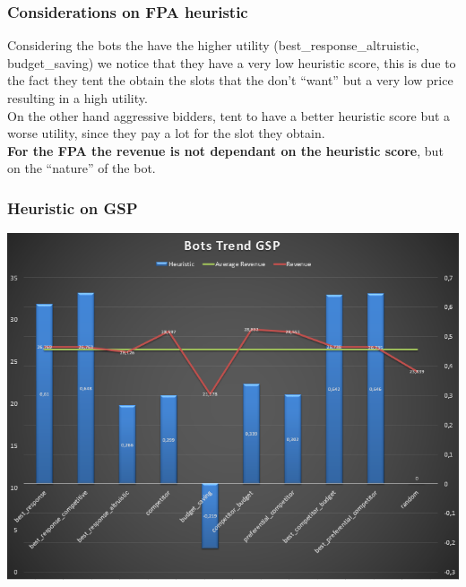 \documentclass{beamer}
\begin{document}
\begin{frame}
\frametitle{Considerations on FPA heuristic}
Considering the bots the have the higher utility (best\_response\_altruistic, budget\_saving) we notice that they have a very \alert{low} heuristic score, this is due to the fact they tent the obtain the slots that the don't ``want'' but a very \alert{low price} resulting in a high utility.\\
\medskip
On the other hand aggressive bidders, tent to have a better heuristic score but a worse utility, since they pay a lot for the slot they obtain.\\
\medskip
\textbf{For the FPA the revenue is not dependant on the heuristic score}, but on the ``nature'' of the bot.
\end{frame}


\begin{frame}
\frametitle{Heuristic on GSP}
\begin{center}
\includegraphics[scale=0.46]{img/Auctions/GSP_all_Heuristic.PNG} 
\end{center}
\end{frame}
\end{document}
